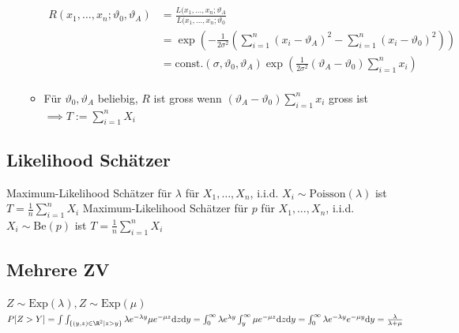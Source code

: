 \begin{itemize}
\begin{itemize}
                \begin{align*}
                    R(x_1, \dots, x_n; \vartheta_0, \vartheta_A) &= \frac{L(x_1, \dots, x_n; \vartheta_A}{L(x_1, \dots, x_n; \vartheta_0}\\
                                                                 &= \exp \left( -\frac{1}{2 \sigma^2} \left( \sum_{i=1}^n (x_i - \vartheta_A)^2 - \sum_{i=1}^n (x_i - \vartheta_0)^2 \right) \right)\\
                                                                 &= \text{const.}(\sigma, \vartheta_0, \vartheta_A) \exp \left( \frac{1}{2 \sigma^2} (\vartheta_A - \vartheta_0) \sum_{i=1}^n x_i \right)\\
                \end{align*}
            \item Für $\vartheta_0, \vartheta_A$ beliebig, $R$ ist gross wenn $(\vartheta_A - \vartheta_0) \sum_{i=1}^n x_i$ gross ist $\implies T := \sum_{i=1}^n X_i$
        \end{itemize}
\end{itemize}

\subsection{Likelihood Schätzer}
\begin{itemize}
     Maximum-Likelihood Schätzer für $\lambda$ für $X_1, \dots, X_n$, i.i.d. $X_i \sim \text{Poisson}(\lambda)$ ist $T = \frac{1}{n} \sum_{i=1}^n X_i$
     Maximum-Likelihood Schätzer für $p$ für $X_1, \dots, X_n$, i.i.d. $X_i \sim \text{Be}(p)$ ist $T = \frac{1}{n} \sum_{i=1}^n X_i$
\end{itemize}

\subsection{Mehrere ZV}
\begin{itemize}
     $Z \sim \text{Exp}(\lambda), Z \sim \text{Exp}(\mu)$
 $P[Z > Y] = \int \int_{\{(y,z) \in \R^2 \mid z > y \}} \lambda e^{-\lambda y} \mu e^{-\mu z} \mathrm{d}z \mathrm{d}y = \int_0^\infty \lambda e^{\lambda y} \int_y^\infty \mu e^{-\mu z} \mathrm{d}z \mathrm{d}y = \int_0^\infty \lambda e^{-\lambda y} e^{-\mu y} \mathrm{d}y = \frac{\lambda}{\lambda + \mu}$
\end{itemize}

